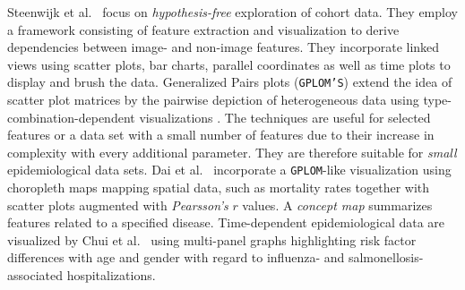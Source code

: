 \documentclass[journal]{style/vgtc} 			          %
\begin{document}

Steenwijk et al.~\cite{Steenwijk} focus on \emph{hypothesis-free} exploration of cohort data.
They employ a framework consisting of feature extraction and visualization to derive dependencies between image- and non-image features.
They incorporate linked views using scatter plots, bar charts, parallel coordinates as well as time plots to display and brush the data.
Generalized Pairs plots (\texttt{GPLOM'S}) extend the idea of scatter plot matrices by the pairwise depiction of heterogeneous data using type-combination-dependent visualizations \cite{GPLOMS, Francois2013}.
The techniques are useful for selected features or a data set with a small number of features due to their increase in complexity with every additional parameter.
They are therefore suitable for \emph{small} epidemiological data sets.
Dai et al.~\cite{Dai2005} incorporate a \texttt{GPLOM}-like visualization using choropleth maps mapping spatial data, such as mortality rates together with scatter plots augmented with \emph{Pearsson's} $r$ values.
A \emph{concept map} summarizes features related to a specified disease.
Time-dependent epidemiological data are visualized by Chui et al.~\cite{Chui2011} using multi-panel graphs highlighting risk factor differences with age and gender with regard to influenza- and salmonellosis-associated hospitalizations.
\end{document}
